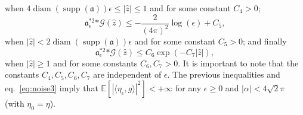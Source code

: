 \documentclass[a4paper,10pt]{article}
\newcommand{\asterisk}{\mathord{*}}
\newcommand{\tmop}[1]{\ensuremath{\operatorname{#1}}}
\begin{document}
when $4 \tmop{diam} (\tmop{supp} (\mathfrak{a})) \epsilon \leqslant | \hat{z}
| \leqslant 1$ and for some constant $C_4 > 0$; \
\begin{equation}
  \mathfrak{a}_{\epsilon}^{\asterisk 2} \asterisk \mathcal{G} (\hat{z})
  \leqslant - \frac{2}{(4 \pi)^2} \log (\epsilon) + C_5,
  \label{eq:probabilistic4}
\end{equation}
when $| \hat{z} | < 2 \tmop{diam} (\tmop{supp} (\mathfrak{a})) \epsilon$ and
for some constant $C_5 > 0$; and finally
\begin{equation}
  \mathfrak{a}_{\epsilon}^{\asterisk 2} \asterisk \mathcal{G} (\hat{z})
  \leqslant C_6 \exp (- C_7 | \hat{z} |) \label{eq:probabilistic5},
\end{equation}
when $| \hat{z} | \geqslant 1$ and for some constants $C_6, C_7 > 0$. It is
important to note that the constants $C_4, C_5, C_6, C_7$ are independent of
$\epsilon$. The previous inequalities and eq.~{\eqref{eq:noise3}} imply that
$\mathbb{E} [| \langle \eta_{\epsilon}, g \rangle |^2] < + \infty$ for any
$\epsilon \geqslant 0$ and $| \alpha | < 4 \sqrt{2} \pi$ (with $\eta_0 =
\eta$).
\end{document}
